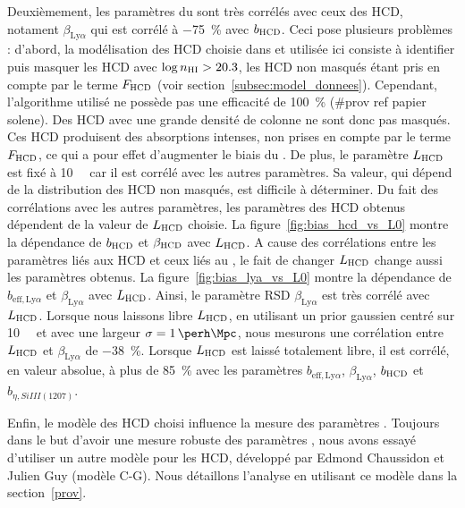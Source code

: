 \documentclass[11pt, twoside, a4paper, openright]{report}
\begin{document}
Deuxièmement, les paramètres du \lya{} sont très corrélés avec ceux des HCD, notament $\beta_{\mathrm{Ly}\alpha}$ qui est corrélé à \SI{-75}{\percent} avec $b_{\textsc{HCD}}$. Ceci pose plusieurs problèmes : d'abord, la modélisation des HCD choisie dans \textcite{prov} et utilisée ici consiste à identifier puis masquer les HCD avec $\log n_{\textsc{HI}} > \num{20.3}$, les HCD non masqués étant pris en compte par le terme $F_{\textsc{HCD}}$ (voir section~\ref{subsec:model_donnees}). Cependant, l'algorithme utilisé ne possède pas une efficacité de \SI{100}{\percent} (\#prov ref papier solene). Des HCD avec une grande densité de colonne ne sont donc pas masqués.
Ces HCD produisent des absorptions intenses, non prises en compte par le terme $F_{\textsc{HCD}}$, ce qui a pour effet d'augmenter le biais du \lya{}.
De plus, le paramètre $L_{\textsc{HCD}}$ est fixé à \SI{10}{\perh\Mpc} car il est corrélé avec les autres paramètres.
Sa valeur, qui dépend de la distribution des HCD non masqués, est difficile à déterminer.
Du fait des corrélations avec les autres paramètres, les paramètres des HCD obtenus dépendent de la valeur de $L_{\textsc{HCD}}$ choisie.
La figure~\ref{fig:bias_hcd_vs_L0} montre la dépendance de $b_{\textsc{HCD}}$ et $\beta_{\textsc{HCD}}$ avec $L_{\textsc{HCD}}$.
A cause des corrélations entre les paramètres liés aux HCD et ceux liés au \lya{}, le fait de changer $L_{\textsc{HCD}}$ change aussi les paramètres \lya{} obtenus.
La figure~\ref{fig:bias_lya_vs_L0} montre la dépendance de $b_{\mathrm{eff},\mathrm{Ly}\alpha}$ et $\beta_{\mathrm{Ly}\alpha}$ avec $L_{\textsc{HCD}}$. Ainsi, le paramètre RSD $\beta_{\mathrm{Ly}\alpha}$ est très corrélé avec $L_{\textsc{HCD}}$. Lorsque nous laissons libre $L_{\textsc{HCD}}$, en utilisant un prior gaussien centré sur \SI{10}{\perh\Mpc} et avec une largeur $\sigma = \SI{1}{\perh\Mpc}$, nous mesurons une corrélation entre $L_{\textsc{HCD}}$ et $\beta_{\mathrm{Ly}\alpha}$ de \SI{-38}{\percent}. Lorsque $L_{\textsc{HCD}}$ est laissé totalement libre, il est corrélé, en valeur absolue, à plus de \SI{85}{\percent} avec les paramètres $b_{\mathrm{eff},\mathrm{Ly}\alpha}$, $\beta_{\mathrm{Ly}\alpha}$, $b_{\textsc{HCD}}$ et $b_{\eta, SiIII(1207)}$.

Enfin, le modèle des HCD choisi influence la mesure des paramètres \lya{}. Toujours dans le but d'avoir une mesure robuste des paramètres \lya{}, nous avons essayé d'utiliser un autre modèle pour les HCD, développé par Edmond Chaussidon et Julien Guy (modèle C-G). Nous détaillons l'analyse en utilisant ce modèle dans la section~\ref{prov}.
\end{document}

